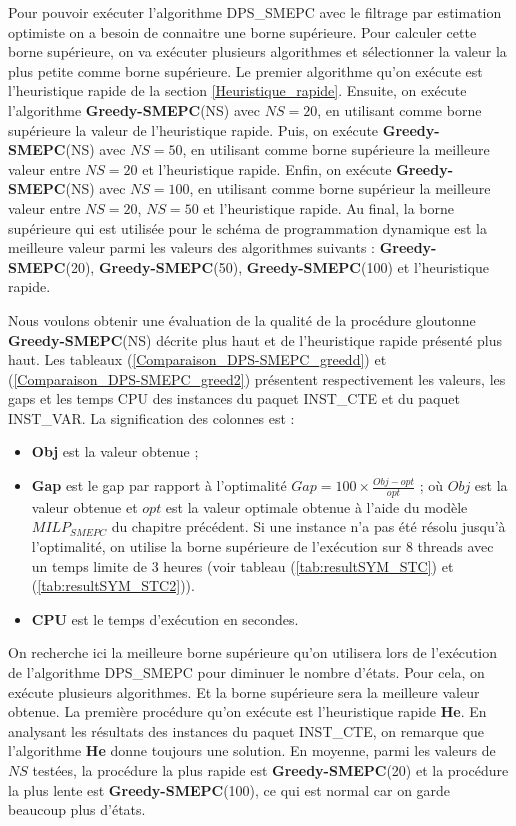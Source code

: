 Pour pouvoir exécuter l'algorithme DPS\_SMEPC avec le filtrage par estimation optimiste on a besoin de connaitre une borne supérieure.
Pour calculer cette borne supérieure, on va exécuter plusieurs algorithmes et sélectionner la valeur la plus petite comme borne supérieure. Le premier algorithme qu'on exécute est l'heuristique rapide de la section \ref{Heuristique_rapide}. Ensuite, on exécute l'algorithme \textbf{Greedy-SMEPC}(NS) avec $NS=20$, en utilisant comme borne supérieure la valeur de l'heuristique rapide. Puis, on exécute \textbf{Greedy-SMEPC}(NS) avec $NS=50$, en utilisant comme borne supérieure la meilleure valeur entre $NS=20$ et l'heuristique rapide. Enfin, on exécute \textbf{Greedy-SMEPC}(NS) avec $NS=100$, en utilisant comme borne supérieur la meilleure valeur entre $NS=20$, $NS=50$ et l'heuristique rapide. Au final, la borne supérieure qui est utilisée pour le schéma de programmation dynamique est la meilleure valeur parmi les valeurs des algorithmes suivants : \textbf{Greedy-SMEPC}(20), \textbf{Greedy-SMEPC}(50), \textbf{Greedy-SMEPC}(100) et l'heuristique rapide.

Nous voulons obtenir une évaluation de la qualité de la procédure gloutonne \textbf{Greedy-SMEPC}(NS) décrite plus haut et de l'heuristique rapide présenté plus haut. Les tableaux (\ref{Comparaison_DPS-SMEPC_greedd}) et (\ref{Comparaison_DPS-SMEPC_greed2}) présentent respectivement les valeurs, les gaps et les temps CPU des instances du paquet INST\_CTE et du paquet INST\_VAR.  La signification des colonnes est :
\begin{itemize}[label=$\square$]
	\item  \textbf{Obj} est la valeur obtenue ;
	\item \textbf{Gap} est le gap par rapport à l'optimalité $Gap  = 100 \times \frac{ Obj-opt}{opt}$ ; où $Obj$ est la valeur obtenue et $opt$ est la valeur optimale obtenue à l'aide du modèle $MILP_{SMEPC}$ du chapitre précédent. Si une instance n'a pas été résolu jusqu'à l'optimalité, on utilise la borne supérieure de l'exécution sur 8 threads avec un temps limite de 3 heures (voir tableau (\ref{tab:resultSYM_STC}) et (\ref{tab:resultSYM_STC2})).
	\item \textbf{CPU} est le temps d'exécution en secondes. 
\end{itemize}

On recherche ici la meilleure borne supérieure qu'on utilisera lors de l'exécution de l'algorithme DPS\_SMEPC pour diminuer le nombre d'états. Pour cela, on exécute plusieurs algorithmes. Et la borne supérieure sera la meilleure valeur obtenue. La première procédure qu'on exécute est l'heuristique rapide \textbf{He}. En analysant les résultats des instances du paquet INST\_CTE, on remarque que l'algorithme \textbf{He} donne toujours une solution. En moyenne, parmi les valeurs de $NS$ testées, la procédure la plus rapide est \textbf{Greedy-SMEPC}(20) et la procédure la plus lente est \textbf{Greedy-SMEPC}(100), ce qui est normal car on garde beaucoup plus d'états.

